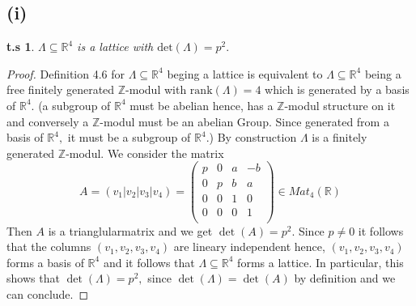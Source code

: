 \documentclass[10pt,a4paper]{article}
\newtheorem*{zz*}{t.s}
\newcommand{\RR}{\mathbb{R}}
\newcommand{\ZZ}{\mathbb{Z}}
\begin{document}
\subsection*{(i)}
	\begin{zz*}
		$\Lambda\subseteq \RR^4$ is a lattice with $\mathrm{det}(\Lambda) = p^2.$
	\end{zz*}
	\begin{proof}
		Definition 4.6 for $\Lambda \subseteq \RR^4$ beging a lattice is equivalent to $\Lambda\subseteq \RR^4$ being a free finitely generated $\ZZ$-modul with $\mathrm{rank}(\Lambda) = 4$ which is generated by a basis of $\RR^4.$ (a subgroup of $\RR^4$ must be abelian hence, has a $\ZZ$-modul structure on it and conversely a $\ZZ$-modul must be an abelian Group. Since generated from a basis of $\RR^4,$ it must be a subgroup of $\RR^4.$)
		By construction $\Lambda$ is a finitely generated $\ZZ$-modul.
		We consider the matrix 
		\[
		A = (v_1|v_2|v_3|v_4) = \begin{pmatrix}
			p & 0 & a & -b \\
			0 & p & b & a \\
			0 & 0 & 1 & 0 \\
			0 & 0 & 0 & 1 \\
		\end{pmatrix}\in Mat_{4}(\RR)
		\]
		Then $A$ is a trianglularmatrix and we get $\det(A) = p^2.$ Since $p\neq0$ it follows that the columns $(v_1, v_2, v_3, v_4)$ are lineary independent hence, $(v_1, v_2,v_3, v_4)$ forms a basis of $\RR^4$ and it follows that $\Lambda\subseteq \RR^4$ forms a lattice. In particular, this shows that $\det(\Lambda) = p^2,$ since $\det(\Lambda) = \det(A)$ by definition and we can conclude. 
	\end{proof}
\end{document}
